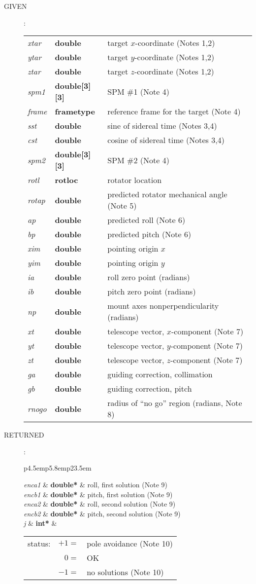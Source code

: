 \documentclass[12pt,fleqn,twoside]{article}
\renewcommand{\_}{{\tt\char'137}}     %
\newcommand{\args}[2]
{
  \goodbreak
  \begin{description}
  \item[#1]: \\[1.5ex] \nopagebreak
    \hspace*{-0.9em}
    \begin{tabular}{p{4.5em}p{5.8em}p{23.5em}}
      #2
    \end{tabular}
  \end{description}
  \vspace{-3ex}
}
\newcommand{\spec}[3]
{
  {\em {#1}} & {\bf \mbox{#2}} & {#3}
}
\begin{document}
\args{GIVEN}
{
\spec{xtar}{double}{target $x$-coordinate (Notes 1,2)} \\
\spec{ytar}{double}{target $y$-coordinate (Notes 1,2)} \\
\spec{ztar}{double}{target $z$-coordinate (Notes 1,2)} \\
\spec{spm1}{double[3][3]}{SPM \#1 (Note 4)} \\
\spec{frame}{{\sc frametype}}{reference frame for the target (Note 4)} \\
\spec{sst}{double}{sine of sidereal time (Notes 3,4)} \\
\spec{cst}{double}{cosine of sidereal time (Notes 3,4)} \\
\spec{spm2}{double[3][3]}{SPM \#2 (Note 4)} \\
\spec{rotl}{{\sc rotloc}}{rotator location} \\
\spec{rotap}{double}{predicted rotator mechanical angle (Note 5)} \\
\spec{ap}{double}{predicted roll (Note 6)} \\
\spec{bp}{double}{predicted pitch (Note 6)} \\
\spec{xim}{double}{pointing origin $x$} \\
\spec{yim}{double}{pointing origin $y$} \\
\spec{ia}{double}{roll zero point (radians)} \\
\spec{ib}{double}{pitch zero point (radians)} \\
\spec{np}{double}{mount axes nonperpendicularity (radians)} \\
\spec{xt}{double}{telescope vector, $x$-component (Note 7)} \\
\spec{yt}{double}{telescope vector, $y$-component (Note 7)} \\
\spec{zt}{double}{telescope vector, $z$-component (Note 7)} \\
\spec{ga}{double}{guiding correction, collimation} \\
\spec{gb}{double}{guiding correction, pitch} \\
\spec{rnogo}{double}{radius of ``no go'' region (radians, Note 8)} \\
}
\args{RETURNED}
{
\spec{enca1}{double*}{roll, first solution (Note 9)} \\
\spec{encb1}{double*}{pitch, first solution (Note 9)} \\
\spec{enca2}{double*}{roll, second solution (Note 9)} \\
\spec{encb2}{double*}{pitch, second solution (Note 9)} \\
\spec{j}{int*}{\hspace{-1.8ex}
               \begin{tabular}[t]{lrl}
                  status: & $ +1 = $ & pole avoidance (Note 10) \\
                          & $  0 = $ & OK                       \\
                          & $ -1 = $ & no solutions (Note 10)   \\
               \end{tabular}
              }
}
\end{document}
